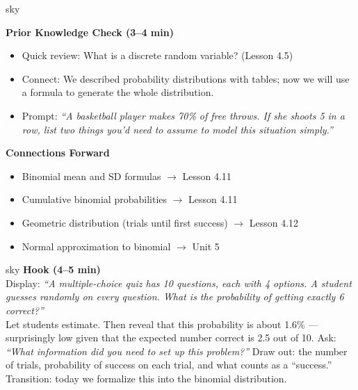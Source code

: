 \documentclass[10pt]{article}
\begin{document}
\begin{skillbox}{sky}
\begin{minipage}[t]{0.48\linewidth}
    \textbf{Prior Knowledge Check (3--4 min)}
    \begin{itemize}
        \item Quick review: What is a discrete random variable? (Lesson 4.5)
        \item Connect: We described probability distributions with tables; now we
              will use a formula to generate the whole distribution.
        \item Prompt: \textit{``A basketball player makes 70\% of free throws.
              If she shoots 5 in a row, list two things you'd need to assume to
              model this situation simply.''}
    \end{itemize}
\end{minipage}
\hfill
\begin{minipage}[t]{0.48\linewidth}
    \textbf{Connections Forward}
    \begin{itemize}
        \item Binomial mean and SD formulas $\to$ Lesson 4.11
        \item Cumulative binomial probabilities $\to$ Lesson 4.11
        \item Geometric distribution (trials until first success) $\to$ Lesson 4.12
        \item Normal approximation to binomial $\to$ Unit 5
    \end{itemize}
\end{minipage}
\end{skillbox}

\begin{skillbox}[Hook]{sky}
    \textbf{Hook (4--5 min)}\\
    Display: \textit{``A multiple-choice quiz has 10 questions, each with 4 options.
    A student guesses randomly on every question. What is the probability of getting
    exactly 6 correct?''} \\[4pt]
    Let students estimate. Then reveal that this probability is about 1.6\% ---
    surprisingly low given that the expected number correct is 2.5 out of 10.
    Ask: \textit{``What information did you need to set up this problem?''} Draw out:
    the number of trials, probability of success on each trial, and what counts as
    a ``success.'' Transition: today we formalize this into the binomial distribution.
\end{skillbox}
\end{document}
